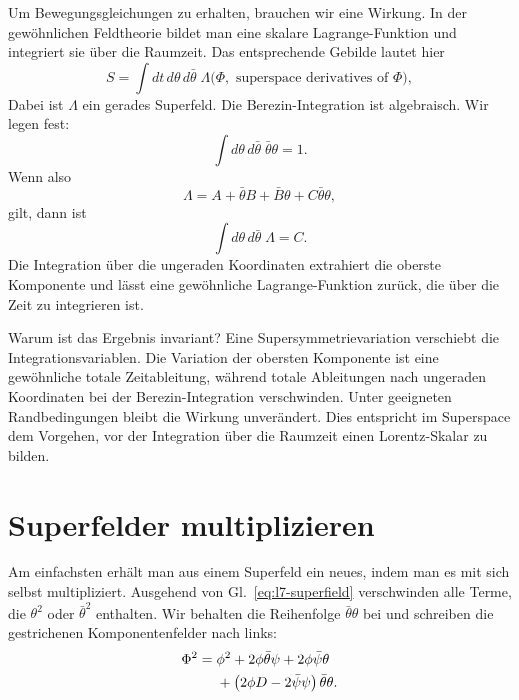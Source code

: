 Um Bewegungsgleichungen zu erhalten, brauchen wir eine Wirkung. In der gewöhnlichen Feldtheorie bildet man eine skalare Lagrange-Funktion und integriert sie über die Raumzeit. Das entsprechende Gebilde lautet hier
\begin{equation}
S=\int dt\,d\theta\,d\bar\theta\;\Lambda
\bigl(\Phi,\text{ superspace derivatives of }\Phi\bigr),
\label{eq:l7-superaction}
\end{equation}
Dabei ist \(\Lambda\) ein gerades Superfeld. Die Berezin-Integration ist algebraisch. Wir legen fest:
\begin{equation}
\int d\theta\,d\bar\theta\;\bar\theta\theta=1.
\end{equation}
Wenn also
\begin{equation}
\Lambda=A+\bar\theta B+\bar B\theta+C\bar\theta\theta,
\end{equation}
gilt, dann ist
\begin{equation}
\int d\theta\,d\bar\theta\;\Lambda=C.
\label{eq:l7-top-component}
\end{equation}
Die Integration über die ungeraden Koordinaten extrahiert die oberste Komponente und lässt eine gewöhnliche Lagrange-Funktion zurück, die über die Zeit zu integrieren ist.

Warum ist das Ergebnis invariant? Eine Supersymmetrievariation verschiebt die Integrationsvariablen. Die Variation der obersten Komponente ist eine gewöhnliche totale Zeitableitung, während totale Ableitungen nach ungeraden Koordinaten bei der Berezin-Integration verschwinden. Unter geeigneten Randbedingungen bleibt die Wirkung unverändert. Dies entspricht im Superspace dem Vorgehen, vor der Integration über die Raumzeit einen Lorentz-Skalar zu bilden.

\section{Superfelder multiplizieren}

Am einfachsten erhält man aus einem Superfeld ein neues, indem man es mit sich selbst multipliziert. Ausgehend von Gl.~\eqref{eq:l7-superfield} verschwinden alle Terme, die \(\theta^2\) oder \(\bar\theta^2\) enthalten. Wir behalten die Reihenfolge \(\bar\theta\theta\) bei und schreiben die gestrichenen Komponentenfelder nach links:
\begin{align}
\Phi^2
={}&\phi^2
+2\phi\bar\theta\psi
+2\phi\bar\psi\theta\notag\\
&+\left(2\phi D-2\bar\psi\psi\right)\bar\theta\theta.
\label{eq:l7-superfield-square}
\end{align}

